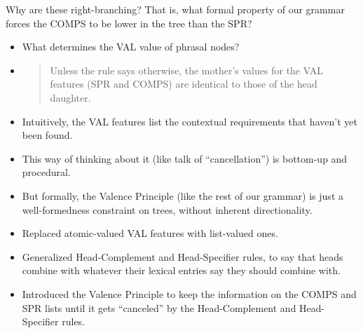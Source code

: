 \documentclass[a4paper,landscape,headrule,footrule,dvips]{foils}
\begin{document}


Why are these right-branching? That is, what formal property of our
grammar forces the COMPS to be lower in the tree than the SPR?

\begin{center}
  \begin{tree}
  \end{tree}
  \begin{tree}
  \end{tree}
\end{center}


\begin{itemize}
\item What determines the VAL value of phrasal nodes?
\item {}
  \begin{quote}
    Unless the rule says otherwise, the mother’s
    values for the VAL features (SPR and
    COMPS) are identical to those of the head
    daughter.
  \end{quote}
\end{itemize}


\begin{itemize}
\item Intuitively, the VAL features list the contextual
requirements that haven’t yet been found.
\item This way of thinking about it (like talk of
“cancellation”) is bottom-up and procedural.
\item But formally, the Valence Principle (like the rest of
our grammar) is just a well-formedness constraint
on trees, without inherent directionality.

\end{itemize}

\begin{itemize}
\item Replaced atomic-valued VAL features with list-valued
ones.
\item Generalized Head-Complement and Head-Specifier
rules, to say that heads combine with whatever their
lexical entries say they should combine with.
\item Introduced the Valence Principle to keep the information on the
  COMPS and SPR lists until it gets ``canceled'' by the
  Head-Complement and Head-Specifier rules.
\end{itemize}
\end{document}
